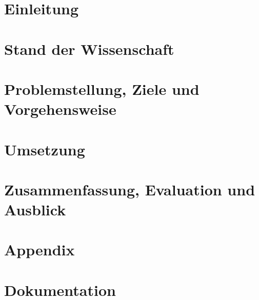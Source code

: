 \documentclass[
	12pt,
	BCOR=10mm,
	listof=totoc,
	bibliography=totoc
	]
{scrbook} %
\begin{document}

\begin{titlepage}
	
\end{titlepage} 

\frontmatter

\tableofcontents

\listoffigures

\listoftables


\twocolumn
\printglossaries

\onecolumn
\mainmatter
\chapter{Einleitung}
\label{ch:introduction}
 	
  
\chapter{Stand der Wissenschaft}
\label{ch:state-art}
 	

\chapter{Problemstellung, Ziele und Vorgehensweise}
\label{ch:probs-obs-procs}
 	
 	
\chapter{Umsetzung}
\label{ch:realisation}
 	
\label{Usecases}
	
 	
\chapter{Zusammenfassung, Evaluation und Ausblick}
\label{ch:summ-eva-outl}
 	

\twocolumn 


\onecolumn
\appendix 	
\chapter{Appendix}
\label{ch:appendix}
 	 
 		
\chapter{Dokumentation}
\label{ch:documentation}
\end{document}
